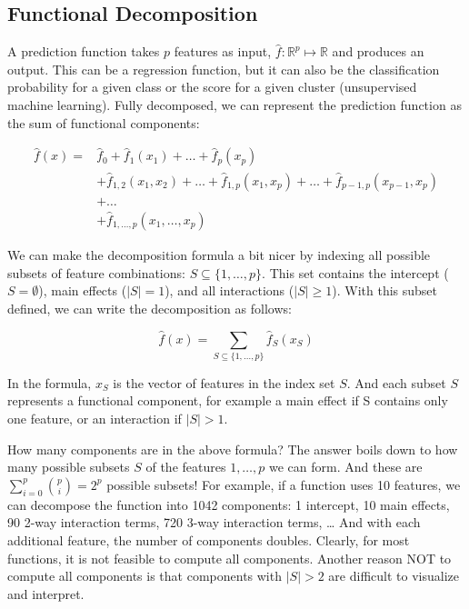 \documentclass[
  11pt,
]{scrbook}
\begin{document}
\hypertarget{functional-decomposition}{%
\subsection{Functional Decomposition}\label{functional-decomposition}}

A prediction function takes \(p\) features as input, \(\hat{f}: \mathbb{R}^p \mapsto \mathbb{R}\) and produces an output.
This can be a regression function, but it can also be the classification probability for a given class or the score for a given cluster (unsupervised machine learning).
Fully decomposed, we can represent the prediction function as the sum of functional components:

\begin{align*}
\hat{f}(x) = & \hat{f}_0 + \hat{f}_1(x_1) + \ldots + \hat{f}_p(x_p) \\
& + \hat{f}_{1,2}(x_1, x_2) + \ldots + \hat{f}_{1,p}(x_1, x_p) + \ldots + \hat{f}_{p-1,p}(x_{p-1}, x_p) \\ 
& + \ldots  \\ & +  \hat{f}_{1,\ldots,p}(x_1, \ldots, x_p)
\end{align*}

We can make the decomposition formula a bit nicer by indexing all possible subsets of feature combinations: \(S\subseteq\{1,\ldots,p\}\).
This set contains the intercept (\(S=\emptyset\)), main effects (\(|S|=1\)), and all interactions (\(|S|\geq{}1\)).
With this subset defined, we can write the decomposition as follows:

\[\hat{f}(x) = \sum_{S\subseteq\{1,\ldots,p\}} \hat{f}_S(x_S)\]

In the formula, \(x_S\) is the vector of features in the index set \(S\).
And each subset \(S\) represents a functional component, for example a main effect if S contains only one feature, or an interaction if \(|S| > 1\).

How many components are in the above formula?
The answer boils down to how many possible subsets \(S\) of the features \(1,\ldots, p\) we can form.
And these are \(\sum_{i=0}^p\binom{p}{i}=2^p\) possible subsets!
For example, if a function uses 10 features, we can decompose the function into 1042 components: 1 intercept, 10 main effects, 90 2-way interaction terms, 720 3-way interaction terms, \ldots{}
And with each additional feature, the number of components doubles.
Clearly, for most functions, it is not feasible to compute all components.
Another reason NOT to compute all components is that components with \(|S|>2\) are difficult to visualize and interpret.
\end{document}
